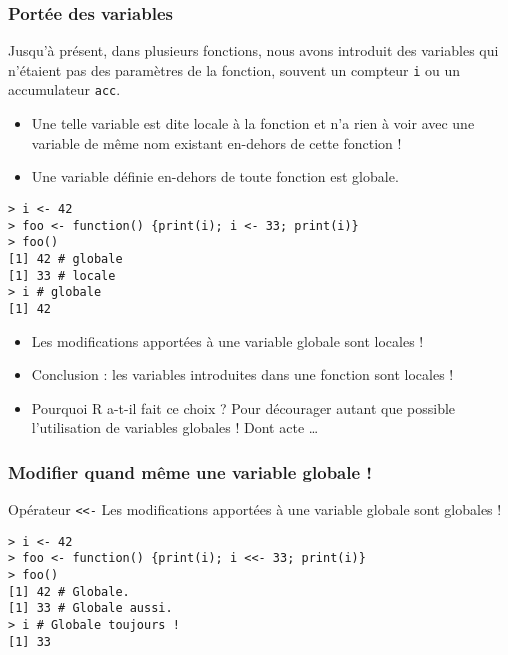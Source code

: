 \documentclass[10pt]{beamer}
\begin{document}
\begin{frame}[fragile]
  \frametitle{Portée des variables}
Jusqu'à présent, dans plusieurs fonctions, nous avons introduit des variables qui n'étaient pas des paramètres de la fonction, souvent un compteur \texttt{i} ou un accumulateur \texttt{acc}.
\begin{itemize}
\item Une telle variable est dite \alert{locale} à la fonction et n'a rien à voir avec une variable de même nom existant en-dehors de cette fonction !  
\item Une variable définie en-dehors de toute fonction est \alert{globale}.  
\end{itemize}

\begin{lstlisting}
> i <- 42
> foo <- function() {print(i); i <- 33; print(i)}
> foo()
[1] 42 # globale
[1] 33 # locale
> i # globale
[1] 42  
\end{lstlisting}
\begin{itemize}
\item<alert@1> Les modifications apportées à une variable globale sont locales !
\item Conclusion : les variables introduites dans une fonction sont locales !
\item<alert@1> Pourquoi R a-t-il fait ce choix ? Pour décourager autant que possible l'utilisation de variables globales ! Dont acte \dots
\end{itemize}

\end{frame}


\begin{frame}[fragile]
  \frametitle{Modifier quand même une variable globale !}

  \begin{alertblock}{Opérateur \alert{\texttt{<<-}}}
    Les modifications apportées à une variable globale sont globales !
  \end{alertblock}

\begin{lstlisting}
> i <- 42
> foo <- function() {print(i); i <<- 33; print(i)}
> foo()
[1] 42 # Globale.
[1] 33 # Globale aussi. 
> i # Globale toujours !
[1] 33
\end{lstlisting}
\end{frame}
\end{document}
